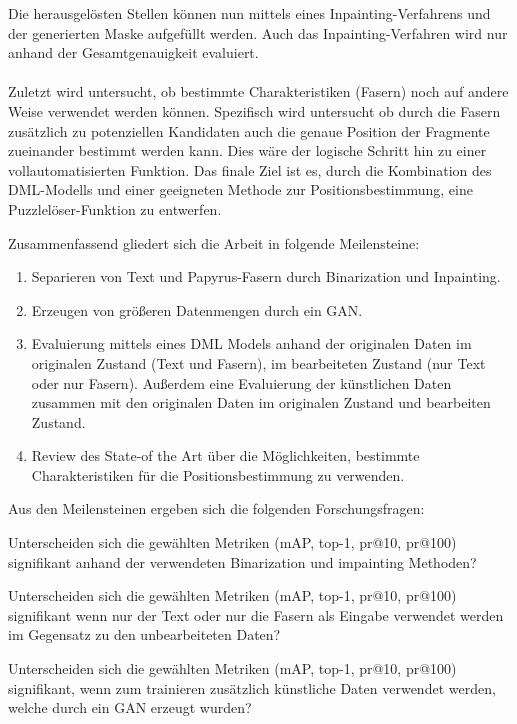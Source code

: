 \documentclass[12pt,a4paper]{article}
\begin{document}
Die herausgelösten Stellen können nun mittels eines Inpainting-Verfahrens und der generierten Maske aufgefüllt werden. Auch das Inpainting-Verfahren wird nur anhand der Gesamtgenauigkeit evaluiert.
\\\\
Zuletzt wird untersucht, ob bestimmte Charakteristiken (Fasern) noch auf andere Weise verwendet werden können. Spezifisch wird untersucht ob durch die Fasern zusätzlich zu potenziellen Kandidaten auch die genaue Position der Fragmente zueinander bestimmt werden kann.
Dies wäre der logische Schritt hin zu einer vollautomatisierten Funktion. Das finale Ziel ist es, durch die Kombination des DML-Modells und einer geeigneten Methode zur Positionsbestimmung, eine Puzzlelöser-Funktion zu entwerfen.

Zusammenfassend gliedert sich die Arbeit in folgende Meilensteine:


\begin{enumerate}
	\item Separieren von Text und Papyrus-Fasern durch Binarization und Inpainting.
	
	\item Erzeugen von größeren Datenmengen durch ein GAN.
	
	\item Evaluierung mittels eines DML Models anhand der originalen Daten im originalen Zustand (Text und Fasern), im bearbeiteten Zustand (nur Text oder nur Fasern). Außerdem eine Evaluierung der künstlichen Daten zusammen mit den originalen Daten im originalen Zustand und bearbeiten Zustand.
	
	\item Review des State-of the Art über die Möglichkeiten, bestimmte Charakteristiken für die Positionsbestimmung zu verwenden. 
	    	      	      	      	      	      	      
\end{enumerate}
		
Aus den Meilensteinen ergeben sich die folgenden Forschungsfragen:

\begin{questions}
	\item Unterscheiden sich die gewählten Metriken (mAP, top-1, pr@10, pr@100) signifikant anhand der verwendeten Binarization und impainting Methoden?
	
	\item  Unterscheiden sich die gewählten Metriken (mAP, top-1, pr@10, pr@100) signifikant wenn nur der Text oder nur die Fasern als Eingabe verwendet werden im Gegensatz zu den unbearbeiteten Daten?  
	\item  Unterscheiden sich die gewählten Metriken (mAP, top-1, pr@10, pr@100) signifikant, wenn zum trainieren zusätzlich künstliche Daten verwendet werden, welche durch ein GAN erzeugt wurden?
\end{questions}
\end{document}
